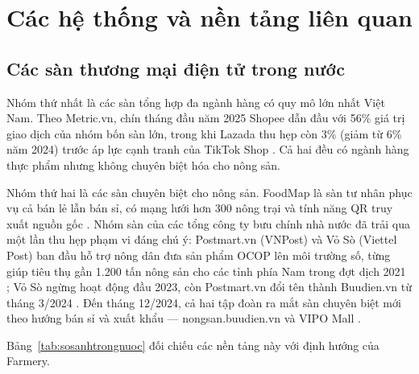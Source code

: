 \section{Các hệ thống và nền tảng liên quan}
\label{sec:hethonglienquan}

\subsection{Các sàn thương mại điện tử trong nước}
\label{subsec:sosanhtrongnuoc}

Nhóm thứ nhất là các sàn tổng hợp đa ngành hàng có quy mô lớn nhất Việt Nam. Theo Metric.vn, chín tháng đầu năm 2025 Shopee dẫn đầu với 56\% giá trị giao dịch của nhóm bốn sàn lớn, trong khi Lazada thu hẹp còn 3\% (giảm từ 6\% năm 2024) trước áp lực cạnh tranh của TikTok Shop \parencite{vneconomy_2025_ecommerce}. Cả hai đều có ngành hàng thực phẩm nhưng không chuyên biệt hóa cho nông sản.

Nhóm thứ hai là các sàn chuyên biệt cho nông sản. FoodMap là sàn tư nhân phục vụ cả bán lẻ lẫn bán sỉ, có mạng lưới hơn 300 nông trại và tính năng QR truy xuất nguồn gốc \parencite{foodmap}. Nhóm sàn của các tổng công ty bưu chính nhà nước đã trải qua một lần thu hẹp phạm vi đáng chú ý: Postmart.vn (VNPost) và Vỏ Sò (Viettel Post) ban đầu hỗ trợ nông dân đưa sản phẩm OCOP lên môi trường số, từng giúp tiêu thụ gần 1.200 tấn nông sản cho các tỉnh phía Nam trong đợt dịch 2021 \parencite{postmart_voso_2021}; Vỏ Sò ngừng hoạt động đầu 2023, còn Postmart.vn đổi tên thành Buudien.vn từ tháng 3/2024 \parencite{buudien_2024}. Đến tháng 12/2024, cả hai tập đoàn ra mắt sàn chuyên biệt mới theo hướng bán sỉ và xuất khẩu --- nongsan.buudien.vn và VIPO Mall \parencite{vipo_nongsan_2024}.

Bảng~\ref{tab:sosanhtrongnuoc} đối chiếu các nền tảng này với định hướng của Farmery.


